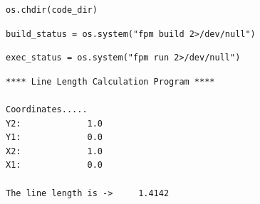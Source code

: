 \begin{verbatim}
os.chdir(code_dir)
\end{verbatim}

\begin{verbatim}
build_status = os.system("fpm build 2>/dev/null")
\end{verbatim}

\begin{verbatim}
exec_status = os.system("fpm run 2>/dev/null")
\end{verbatim}

\begin{verbatim}
**** Line Length Calculation Program ****

Coordinates.....
Y2:             1.0
Y1:             0.0
X2:             1.0
X1:             0.0

The line length is ->     1.4142
\end{verbatim}
